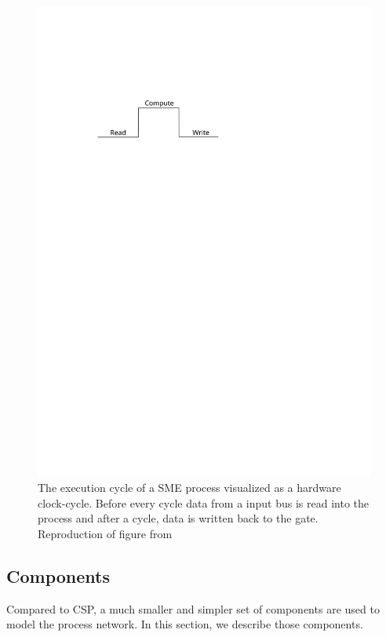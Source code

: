 \begin{figure}
\centering
\includegraphics{figures/execution-cycle}
\caption[Execution flow of a SME-process]{The execution cycle of a
  SME process visualized as a hardware clock-cycle. Before every cycle
  data from a input bus is read into the process and after a cycle,
  data is written back to the gate. Reproduction of figure from \cite{vinter2014synchronous}}
\label{fig:cycle}
\end{figure}


\subsection{Components}
Compared to CSP, a much smaller and simpler set of components are used
to model the process network. In this section, we describe those
components.

